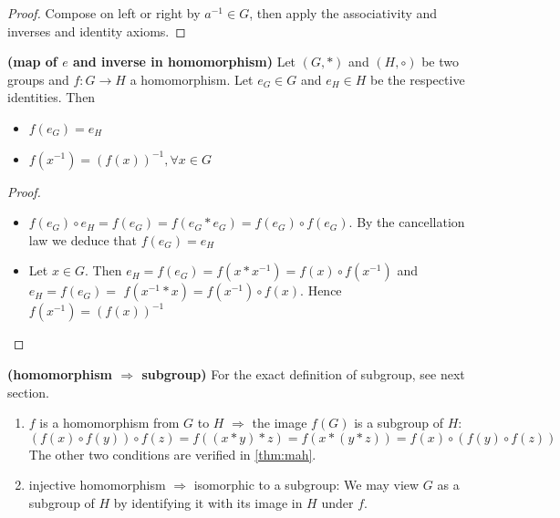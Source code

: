 \documentclass{article}
\newcommand{\bfs}[1]{\textbf{({#1}) }}
\begin{document}
\begin{proof}
Compose on left or right by $a^{-1} \in G$, then apply the associativity and inverses and identity axioms.
\end{proof}
\begin{thma}{\bfs{map of $e$ and inverse in homomorphism}}\label{thm:mah}
Let $(G, *)$ and $(H, \circ)$ be two groups and $f: G \rightarrow H$ a homomorphism. Let $e_{G} \in G$ and $e_{H} \in H$ be the respective identities. Then
\begin{itemize}
    \item $f\left(e_{G}\right)=e_{H}$
    \item $f\left(x^{-1}\right)=(f(x))^{-1}, \forall x \in G$
\end{itemize}
\end{thma}
\begin{proof}
\begin{itemize}
    \item $f\left(e_{G}\right) \circ e_{H}=f\left(e_{G}\right)=f\left(e_{G} * e_{G}\right)=f\left(e_{G}\right) \circ f\left(e_{G}\right) .$ By the cancellation law we
deduce that $f\left(e_{G}\right)=e_{H}$
\item Let $x \in G .$ Then $e_{H}=f\left(e_{G}\right)=f\left(x * x^{-1}\right)=f(x) \circ f\left(x^{-1}\right)$ and $e_{H}=f\left(e_{G}\right)=$
$f\left(x^{-1} * x\right)=f\left(x^{-1}\right) \circ f(x) .$ Hence $f\left(x^{-1}\right)=(f(x))^{-1}$
\end{itemize}
\end{proof}

\begin{rema}{\bfs{homomorphism $\Rightarrow$ subgroup}}\label{rm:sugr_ho}For the exact definition of subgroup, see next section.
\begin{enumerate}
    \item $f$ is a homomorphism from $G$ to $H$ $\Rightarrow$ the image $f(G)$ is a subgroup of $H$:
        $$(f(x)\circ f(y)) \circ f(z) = f((x*y)*z) = f(x*(y*z)) = f(x)\circ (f(y) \circ f(z))$$
        The other two conditions are verified in \cref{thm:mah}.
    \item injective homomorphism $\Rightarrow$ isomorphic to a subgroup:
We may view $G$ as a subgroup of $H$ by identifying it with its image in $H$ under $f$. 
\end{enumerate}
\end{rema}
\end{document}
